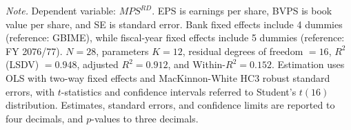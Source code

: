 \begin{table}[!htbp]
\vspace{4pt}
\begin{minipage}{\linewidth}
\footnotesize
\textit{Note.} Dependent variable: $\mathit{MPS}^{RD}$. EPS is earnings per share, BVPS is book value per share, and SE is standard error. Bank fixed effects include 4 dummies (reference: GBIME), while fiscal-year fixed effects include 5 dummies (reference: FY 2076/77). $N = 28$, parameters $K = 12$, residual degrees of freedom $= 16$, $R^2$ (LSDV) $= 0.948$, adjusted $R^2 = 0.912$, and Within-$R^2 = 0.152$. Estimation uses OLS with two-way fixed effects and MacKinnon-White HC3 robust standard errors, with $t$-statistics and confidence intervals referred to Student's $t(16)$ distribution. Estimates, standard errors, and confidence limits are reported to four decimals, and $p$-values to three decimals.
\end{minipage}
\end{table}
